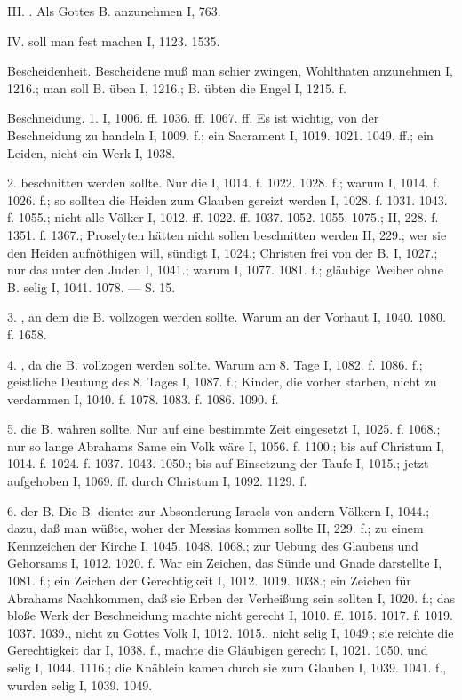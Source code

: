 III. . Als Gottes B. anzunehmen I, 763.

IV.  soll man fest machen I, 1123. 1535.

Bescheidenheit. Bescheidene muß man schier zwingen, Wohlthaten anzunehmen I, 1216.; man soll B. üben I, 1216.; B. übten die Engel I, 1215. f.

Beschneidung. 1.  I, 1006. ff. 1036. ff. 1067. ff. Es ist wichtig, von der Beschneidung zu handeln I, 1009. f.; ein Sacrament I, 1019. 1021. 1049. ff.; ein Leiden, nicht ein Werk I, 1038.

2.  beschnitten werden sollte. Nur die  I, 1014. f. 1022. 1028. f.; warum I, 1014. f. 1026. f.; so sollten die Heiden zum Glauben gereizt werden I, 1028. f. 1031. 1043. f. 1055.; nicht alle Völker I, 1012. ff. 1022. ff. 1037. 1052. 1055. 1075.; II, 228. f. 1351. f. 1367.; Proselyten hätten nicht sollen beschnitten werden II, 229.; wer sie den Heiden aufnöthigen will, sündigt I, 1024.; Christen frei von der B. I, 1027.; nur das  unter den Juden I, 1041.; warum I, 1077. 1081. f.; gläubige Weiber ohne B. selig I, 1041. 1078. — S.  15.

3. , an dem die B. vollzogen werden sollte. Warum an der Vorhaut I, 1040. 1080. f. 1658.

4. , da die B. vollzogen werden sollte. Warum am 8. Tage I, 1082. f. 1086. f.; geistliche Deutung des 8. Tages I, 1087. f.; Kinder, die vorher starben, nicht zu verdammen I, 1040. f. 1078. 1083. f. 1086. 1090. f.

5.  die B. währen sollte. Nur auf eine bestimmte Zeit eingesetzt I, 1025. f. 1068.; nur so lange Abrahams Same ein Volk wäre I, 1056. f. 1100.; bis auf Christum I, 1014. f. 1024. f. 1037. 1043. 1050.; bis auf Einsetzung der Taufe I, 1015.; jetzt aufgehoben I, 1069. ff. durch Christum I, 1092. 1129. f.

6.  der B. Die B. diente: zur Absonderung Israels von andern Völkern I, 1044.; dazu, daß man wüßte, woher der Messias kommen sollte II, 229. f.; zu einem Kennzeichen der Kirche I, 1045. 1048. 1068.; zur Uebung des Glaubens und Gehorsams I, 1012. 1020. f. War ein Zeichen, das Sünde und Gnade darstellte I, 1081. f.; ein Zeichen der Gerechtigkeit I, 1012. 1019. 1038.; ein Zeichen für Abrahams Nachkommen, daß sie Erben der Verheißung sein sollten I, 1020. f.; das bloße Werk der Beschneidung machte nicht gerecht I, 1010. ff. 1015. 1017. f. 1019. 1037. 1039., nicht zu Gottes Volk I, 1012. 1015., nicht selig I, 1049.; sie reichte die Gerechtigkeit dar I, 1038. f., machte die Gläubigen gerecht I, 1021. 1050. und selig I, 1044. 1116.; die Knäblein kamen durch sie zum Glauben I, 1039. 1041. f., wurden selig I, 1039. 1049.


